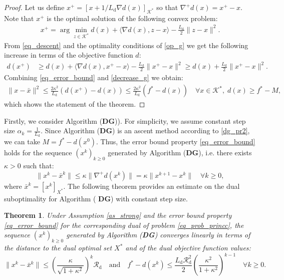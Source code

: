 \documentclass{gOMS2e}
\theoremstyle{plain}
\newtheorem{theorem}{Theorem}[section]
\theoremstyle{definition}
\theoremstyle{remark}
\begin{document}
\begin{proof}
Let us define $x^+ = [x + 1/L_\text{d} \nabla d(x)]_{{\mathcal{K}}^*}$ so that $\nabla^+ d(x) = x^+ - x$.  Note that $x^+$ is the optimal solution of the following convex problem:
\begin{align}
\label{op_g} x^+ = \arg \min_{z \in {{\mathcal{K}}^*}} d(x) + \langle \nabla d(x),
z-x \rangle - \frac{L_\text{d}}{2} \|z - x\|^2.
\end{align}
From \eqref{eq_descent} and  the optimality conditions of
\eqref{op_g} we get the following increase in terms of the objective
function $d$:
\begin{align}
\label{decrease_g} d(x^+) & \geq d(x) + \langle \nabla d(x), x^+ - x
\rangle - \frac{L_\text{d}}{2} \| x^+ - x\|^2 \geq d(x) + \frac{L_\text{d}}{2} \|
x^+ - x\|^2.
\end{align}
Combining  \eqref{eq_error_bound} and  \eqref{decrease_g} we obtain:
\begin{align*}
\| x - \bar{x}\|^2 \leq \frac{2 \kappa^2}{L_\text{d}} (d(x^+) - d(x)) \leq
\frac{2 \kappa^2}{L_\text{d}} (f^* - d(x))   \quad \forall x \in {{\mathcal{K}}^*}, \; d(x) \geq f^* - M,
\end{align*}
which shows the statement of the theorem.
\end{proof}

\noindent Firstly, we consider Algorithm (\textbf{DG})). For simplicity, we assume
constant step size $\alpha_k = \frac{1}{L_\text{d}}$. Since
Algorithm (\textbf{DG}) is an ascent method according to
\eqref{dg_pr2}, we can take $M = f^* -d(x^0)$. Thus, the error bound
property \eqref{eq_error_bound} holds for the sequence $(x^k)_{k
\geq 0}$ generated by  Algorithm (\textbf{DG}), i.e. there exists
$\kappa > 0$ such that:
\begin{equation}
\label{global_error_bound} \|x^k - \bar{x}^k\| \leq \kappa
\|\nabla^+ d(x^k)\| = \kappa \|x^{k+1} - x^k\| \quad \forall k \geq
0,
\end{equation}
where  $\bar{x}^k  = \left[x^k\right]_{X^*}$.  The following theorem
provides an estimate on the dual suboptimality for Algorithm ({\bf
DG}) with constant step size.

\begin{theorem}
\label{theorem_dual_optim_dg} Under Assumption \eqref{as_strong} and the error bound property \eqref{eq_error_bound} for the  corresponding dual  of problem  \eqref{eq_prob_princc},  the sequence $\left(x^k\right)_{k\geq 0}$  generated
by Algorithm ({\bf DG}) converges linearly in terms of the distance to the dual optimal set $X^*$ and of the  dual objective function values:
\begin{equation}
\label{bound_dual_optim_dg}
\| x^k - \bar{x}^k \| \leq \left( \frac{\kappa}{\sqrt{1+\kappa^2}}\right)^{k} \mathcal{R}_\text{d} \quad
\text{and} \quad f^* - d({x}^{k}) \leq \frac{{L_{\mathrm{d}}}
\mathcal{R}^2_\text{d}}{2}
\left(\frac{\kappa^2}{1+\kappa^2}\right)^{k-1} \quad \forall k \geq 0.
\end{equation}
\end{theorem}
\end{document}
